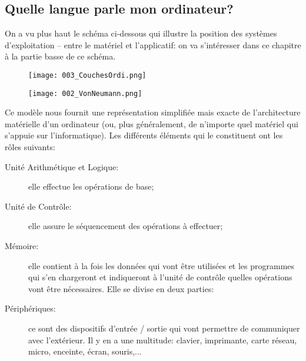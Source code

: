 \documentclass[12pt]{article}
\begin{document}
	 \subsection{Quelle langue parle mon ordinateur?}

	On a vu plus haut le schéma ci-dessous qui illustre la position des systèmes d'exploitation -- entre le matériel et l'applicatif: on va s'intéresser dans ce chapitre à la partie basse de ce schéma.
	
	 \begin{figure}[H]
	 	\centering
	 	\texttt{[image: 003\_CouchesOrdi.png]}
	 \end{figure}
	 
	 
	 	\begin{MaReponse} 
	 	
	 	\begin{figure}[H]
	 		\centering
	 		\texttt{[image: 002\_VonNeumann.png]}
	 	\end{figure}
	 	
	 	Ce modèle nous fournit une représentation simplifiée mais exacte de l'architecture matérielle d'un ordinateur (ou, plus généralement, de n'importe quel matériel qui s'appuie sur l'informatique). Les différents éléments qui le constituent ont les rôles suivants:
	 	
	 	\begin{description}
	 		\item[Unité Arithmétique et Logique:] elle effectue les opérations de base;
	 		\item[Unité de Contrôle:] elle assure le séquencement des opérations à effectuer;
	 		\item[Mémoire:] elle contient à la fois les données qui vont être utilisées et les programmes qui s'en chargeront et indiqueront à l'unité de contrôle quelles opérations vont être nécessaires. Elle se divise en deux parties:
	 		
	 		
	 		\item[Périphériques:] ce sont des dispositifs d'entrée / sortie qui vont permettre de communiquer avec l'extérieur. Il y en a une multitude: clavier, imprimante, carte réseau, micro, enceinte, écran, souris,...
	 	\end{description}
	 	
	 \end{MaReponse}
	 
\end{document}
